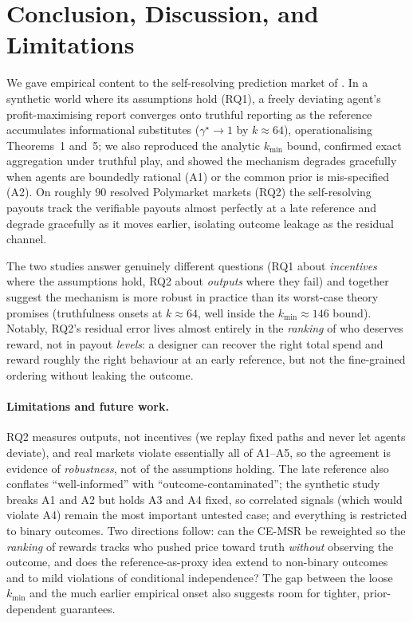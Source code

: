 \section{Conclusion, Discussion, and Limitations}
\label{sec:conclusion}

We gave empirical content to the self-resolving prediction market of
\textcite{srinivasan2025selfresolving}. In a synthetic world where its assumptions hold
(RQ1), a freely deviating agent's profit-maximising report converges onto truthful
reporting as the reference accumulates informational substitutes ($\gamma^\star\to 1$ by
$k\approx 64$), operationalising Theorems~1 and~5; we also reproduced the analytic $k_{\min}$
bound, confirmed exact aggregation under truthful play, and showed the mechanism degrades
gracefully when agents are boundedly rational (A1) or the common prior is mis-specified (A2).
On roughly
$90$ resolved
Polymarket markets (RQ2) the self-resolving payouts track the verifiable payouts almost
perfectly at a late reference and degrade gracefully as it moves earlier, isolating outcome
leakage as the residual channel.

The two studies answer genuinely different questions (RQ1 about \emph{incentives} where
the assumptions hold, RQ2 about \emph{outputs} where they fail) and together suggest the
mechanism is more robust in practice than its worst-case theory promises (truthfulness
onsets at $k\approx 64$, well inside the $k_{\min}\approx 146$ bound). Notably, RQ2's
residual error lives almost entirely in the \emph{ranking} of who deserves reward, not in
payout \emph{levels}: a designer can recover the right total spend and reward roughly the
right behaviour at an early reference, but not the fine-grained ordering without leaking the
outcome.

\paragraph{Limitations and future work.}
RQ2 measures outputs, not incentives (we replay fixed paths and never let agents deviate),
and real markets violate essentially all of A1--A5, so the agreement is evidence of
\emph{robustness}, not of the assumptions holding. The late reference also conflates
``well-informed'' with ``outcome-contaminated''; the synthetic study breaks A1 and A2 but
holds A3 and A4 fixed, so correlated signals (which would violate A4) remain the most
important untested case; and everything is restricted to binary outcomes. Two directions follow: can the
CE-MSR be reweighted so the \emph{ranking} of rewards tracks who pushed price toward truth
\emph{without} observing the outcome, and does the reference-as-proxy idea extend to
non-binary outcomes and to mild violations of conditional independence? The gap between the
loose $k_{\min}$ and the much earlier empirical onset also suggests room for tighter,
prior-dependent guarantees.
